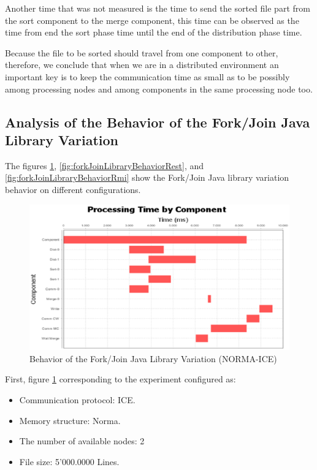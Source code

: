 Another time that was not measured is the time to send the sorted file part from the sort component to the merge component, this time can be observed as the time from end the sort phase time until the end of the distribution phase time. 

Because the file to be sorted should travel from one component to other, therefore, we conclude that when we are in a distributed environment an important key is to keep the communication time as small as to be possibly among processing nodes and among components in the same processing node too.


\subsection{Analysis of the Behavior of the Fork/Join Java Library Variation }

The figures \ref{fig:forkJoinLibraryBehaviorIce}, \ref{fig:forkJoinLibraryBehaviorRest}, and \ref{fig:forkJoinLibraryBehaviorRmi} show the Fork/Join Java library variation behavior on different configurations. 

\begin{figure}[H]
	\centering
	\includegraphics[trim=0.5cm 17cm -5cm 1cm, scale=0.9]{fig/FJNormaIce250Behavior.eps}
	\caption{Behavior of the Fork/Join Java Library Variation (NORMA-ICE)}
	\label{fig:forkJoinLibraryBehaviorIce}
\end{figure}
First, figure \ref{fig:forkJoinLibraryBehaviorIce} corresponding to the experiment configured as: 
\begin{itemize}
	\item Communication protocol: ICE.
	\item  Memory structure: Norma.
	\item The number of available nodes: 2
	\item File size: 5'000.0000 Lines.
\end{itemize}

